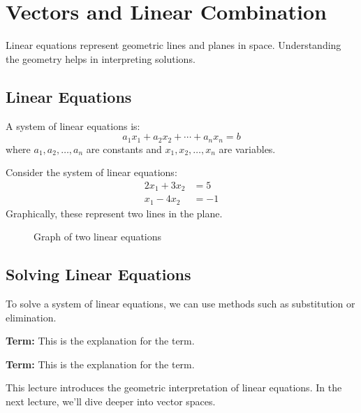 \section{Vectors and Linear Combination}
\label{sec:vectors_and_linear_combination}

Linear equations represent geometric lines and planes in space. Understanding the geometry helps in interpreting solutions.

\subsection{Linear Equations}
A system of linear equations is:
\[
    a_1x_1 + a_2x_2 + \cdots + a_nx_n = b
\]
where $a_1, a_2, \dots, a_n$ are constants and $x_1, x_2, \dots, x_n$ are variables.

\begin{example}
    Consider the system of linear equations:
    \[
        \begin{aligned}
            2x_1 + 3x_2 & = 5  \\
            x_1 - 4x_2  & = -1
        \end{aligned}
    \]
    Graphically, these represent two lines in the plane.
\end{example}

\begin{figure}[h]
    \centering
    \caption{Graph of two linear equations}
    \label{fig:geometry_example}
\end{figure}

\subsection{Solving Linear Equations}
To solve a system of linear equations, we can use methods such as substitution or elimination.

\begin{mdframed}
    \textbf{Term:} This is the explanation for the term.
\end{mdframed}

\begin{tcolorbox}[colframe=blue!75!black, colback=blue!10!white, title=Callout]
    \textbf{Term:} This is the explanation for the term.
\end{tcolorbox}



This lecture introduces the geometric interpretation of linear equations. In the next lecture, we'll dive deeper into vector spaces.

\label{sec:vectors_and_linear_combination_end}

